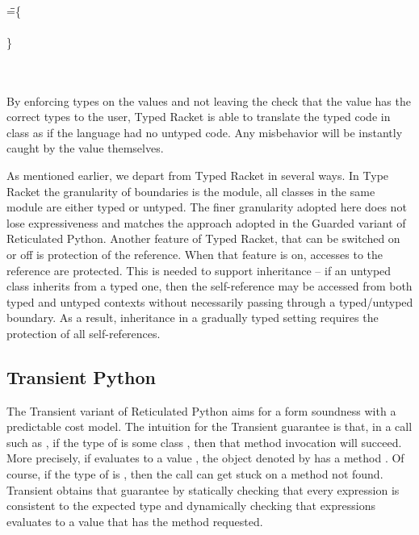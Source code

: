 \documentclass[acmsmall, anonymous, authordraft, review]{acmart} %
\begin{document}
\medskip
\begin{minipage}{\textwidth}
\begin{tabbing}
\HS\HS \KCall{\New\A{}}\m{\BehCast\any{\New\C{}}}\any\any \\
\HS\HS\HS\HS\HS\HS\HS\HS\HS\HS\HS\HS\HS\HS\HS\HS\HS\HS\HS\HS\HS
\WHERE\HS\K\HS=\HS\=
\class\= \A \{\\
\>\HS \Mdef\m\x\any\any{ ~ \BehCast\any{\KCall{\New\D{}}\m{\BehCast\D\x}{\D}\D~}} \\
\>\}\\
 \>  \Class\D{}{\Mdef\m\x\D\D{\KCall\x\m\x\D\D}} \\
 \>  \Class{\C}{}{\Mdef\m\x{\any}{\any}{\x}} \\
\end{tabbing}
\end{minipage}
\medskip


\noindent By enforcing types on the values and not leaving the check that
the value has the correct types to the user, Typed Racket is able to
translate the typed code in class \D as if the language had no untyped
code. Any misbehavior will be instantly caught by the value themselves.

As mentioned earlier, we depart from Typed Racket in several ways. In Type
Racket the granularity of boundaries is the module, all classes in the same
module are either typed or untyped.  The finer granularity adopted here does
not lose expressiveness and matches the approach adopted in the Guarded
variant of Reticulated Python. Another feature of Typed Racket, that can be
switched on or off is protection of the \this reference. When that feature
is on, accesses to the \this reference are protected. This is needed to
support inheritance -- if an untyped class inherits from a typed one, then
the self-reference may be accessed from both typed and untyped contexts
without necessarily passing through a typed/untyped boundary. As a result,
inheritance in a gradually typed setting requires the protection of all
self-references.


\subsection{Transient Python}

The Transient variant of Reticulated Python aims for a form soundness with a
predictable cost model. The intuition for the Transient guarantee is that,
in a call such as \Call\e\m\ep, if the type of \e is some class \C, then that
method invocation will succeed. More precisely, if \e evaluates to a value
\a, the object denoted by \a has a method \m. Of course, if the type of \e is
\any, then the call can get stuck on a method not found. Transient obtains
that guarantee by statically checking that every expression is consistent to
the expected type and dynamically checking that expressions evaluates to a
value that has the method requested.
\end{document}
